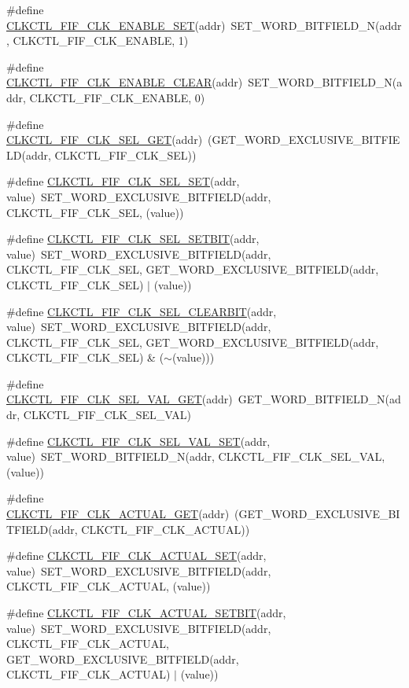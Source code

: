 \begin{DoxyCompactItemize}
\item 
\#define \hyperlink{a00544_abcd04df02b52df738c8827ac81fff6be}{CLKCTL\_\-FIF\_\-CLK\_\-ENABLE\_\-SET}(addr)~SET\_\-WORD\_\-BITFIELD\_\-N(addr, CLKCTL\_\-FIF\_\-CLK\_\-ENABLE, 1)
\item 
\#define \hyperlink{a00544_acdb462a9ae40763c449fb279f4863cdc}{CLKCTL\_\-FIF\_\-CLK\_\-ENABLE\_\-CLEAR}(addr)~SET\_\-WORD\_\-BITFIELD\_\-N(addr, CLKCTL\_\-FIF\_\-CLK\_\-ENABLE, 0)
\item 
\#define \hyperlink{a00544_a74c77d892a45ea75b73b17e0749dbd3b}{CLKCTL\_\-FIF\_\-CLK\_\-SEL\_\-GET}(addr)~(GET\_\-WORD\_\-EXCLUSIVE\_\-BITFIELD(addr, CLKCTL\_\-FIF\_\-CLK\_\-SEL))
\item 
\#define \hyperlink{a00544_a2fbef56521b7d53d552d26976c32b8cb}{CLKCTL\_\-FIF\_\-CLK\_\-SEL\_\-SET}(addr, value)~SET\_\-WORD\_\-EXCLUSIVE\_\-BITFIELD(addr, CLKCTL\_\-FIF\_\-CLK\_\-SEL, (value))
\item 
\#define \hyperlink{a00544_a6675000be59c846c7b0da5484db37ec2}{CLKCTL\_\-FIF\_\-CLK\_\-SEL\_\-SETBIT}(addr, value)~SET\_\-WORD\_\-EXCLUSIVE\_\-BITFIELD(addr, CLKCTL\_\-FIF\_\-CLK\_\-SEL, GET\_\-WORD\_\-EXCLUSIVE\_\-BITFIELD(addr, CLKCTL\_\-FIF\_\-CLK\_\-SEL) $|$ (value))
\item 
\#define \hyperlink{a00544_af73e04b063e64f0850c1847521d2e3df}{CLKCTL\_\-FIF\_\-CLK\_\-SEL\_\-CLEARBIT}(addr, value)~SET\_\-WORD\_\-EXCLUSIVE\_\-BITFIELD(addr, CLKCTL\_\-FIF\_\-CLK\_\-SEL, GET\_\-WORD\_\-EXCLUSIVE\_\-BITFIELD(addr, CLKCTL\_\-FIF\_\-CLK\_\-SEL) \& ($\sim$(value)))
\item 
\#define \hyperlink{a00544_a4fa26b814139ee60658790016f4a2b64}{CLKCTL\_\-FIF\_\-CLK\_\-SEL\_\-VAL\_\-GET}(addr)~GET\_\-WORD\_\-BITFIELD\_\-N(addr, CLKCTL\_\-FIF\_\-CLK\_\-SEL\_\-VAL)
\item 
\#define \hyperlink{a00544_ac5c6b5038461c44f713743783f6540d6}{CLKCTL\_\-FIF\_\-CLK\_\-SEL\_\-VAL\_\-SET}(addr, value)~SET\_\-WORD\_\-BITFIELD\_\-N(addr, CLKCTL\_\-FIF\_\-CLK\_\-SEL\_\-VAL, (value))
\item 
\#define \hyperlink{a00544_adcbc92603a86a6a53505a6653cf41498}{CLKCTL\_\-FIF\_\-CLK\_\-ACTUAL\_\-GET}(addr)~(GET\_\-WORD\_\-EXCLUSIVE\_\-BITFIELD(addr, CLKCTL\_\-FIF\_\-CLK\_\-ACTUAL))
\item 
\#define \hyperlink{a00544_acd3686411c1ed4c097d4f982e151caa8}{CLKCTL\_\-FIF\_\-CLK\_\-ACTUAL\_\-SET}(addr, value)~SET\_\-WORD\_\-EXCLUSIVE\_\-BITFIELD(addr, CLKCTL\_\-FIF\_\-CLK\_\-ACTUAL, (value))
\item 
\#define \hyperlink{a00544_ac60cbe308a3de96f0386a0c0056a3183}{CLKCTL\_\-FIF\_\-CLK\_\-ACTUAL\_\-SETBIT}(addr, value)~SET\_\-WORD\_\-EXCLUSIVE\_\-BITFIELD(addr, CLKCTL\_\-FIF\_\-CLK\_\-ACTUAL, GET\_\-WORD\_\-EXCLUSIVE\_\-BITFIELD(addr, CLKCTL\_\-FIF\_\-CLK\_\-ACTUAL) $|$ (value))

\end{DoxyCompactItemize}
